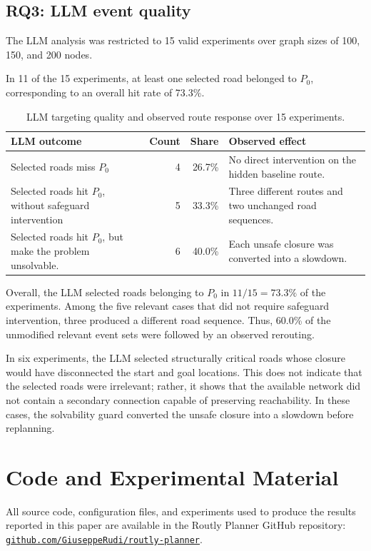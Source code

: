 \documentclass[10pt]{article}
\begin{document}
\subsection{RQ3: LLM event quality}

The LLM analysis was restricted to 15 valid experiments over graph sizes of
100, 150, and 200 nodes. 

In 11 of the 15
experiments, at least one selected road belonged to \(P_0\), corresponding to
an overall hit rate of 73.3\%.

\begin{table}[H]
\centering
\caption{LLM targeting quality and observed route response over 15 experiments.}
\label{tab:llm-results}
\scriptsize
\begin{tabularx}{\linewidth}{@{}Y r r Y@{}}
\toprule
LLM outcome & Count & Share & Observed effect \\
\midrule

Selected roads miss \(P_0\)
& 4
& 26.7\%
& No direct intervention on the hidden baseline route. \\

Selected roads hit \(P_0\), without safeguard intervention
& 5
& 33.3\%
& Three different routes and two unchanged road sequences. \\

Selected roads hit \(P_0\), but make the problem unsolvable.
& 6
& 40.0\%
& Each unsafe closure was converted into a slowdown. \\

\bottomrule
\end{tabularx}
\end{table}

Overall, the LLM selected roads belonging to \(P_0\) in
\(11/15=73.3\%\) of the experiments. Among the five relevant cases that did
not require safeguard intervention, three produced a different road sequence.
Thus, 60.0\% of the unmodified relevant event sets were followed by an
observed rerouting.

In six experiments, the LLM selected structurally critical roads whose closure
would have disconnected the start and goal locations. This does not indicate
that the selected roads were irrelevant; rather, it shows that the available
network did not contain a secondary connection capable of preserving
reachability. In these cases, the solvability guard converted the unsafe
closure into a slowdown before replanning.

\section{Code and Experimental Material}
All source code, configuration files, and experiments used to produce the
results reported in this paper are available in the Routly Planner GitHub
repository:
\href{https://github.com/GiuseppeRudi/routly-planner}{\texttt{github.com/GiuseppeRudi/routly-planner}}.
\end{document}
